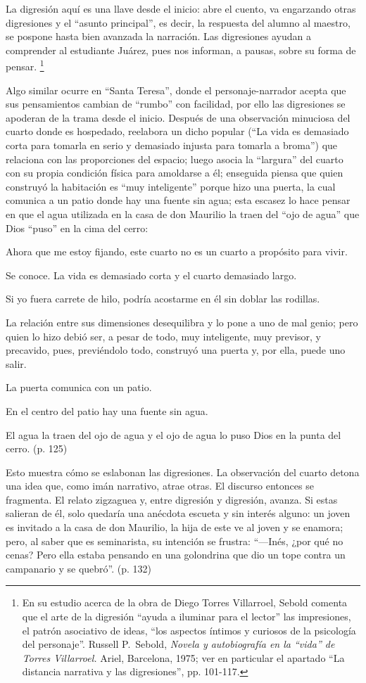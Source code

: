 \documentclass[14pt,twoside,final]{extbook} %
\let\oldfootnote\footnote
\renewcommand\footnote[1]{%
\oldfootnote{\hspace{1mm}#1}}
\begin{document}
La digresión aquí es una llave desde el inicio: abre el cuento, va engarzando otras digresiones y el ``asunto principal'', es decir, la respuesta del alumno al maestro, se pospone hasta bien avanzada la
narración. Las digresiones ayudan a comprender al estudiante Juárez, pues nos informan, a pausas, sobre su forma de pensar.\footnote{En su estudio acerca de la obra de Diego Torres Villarroel, Sebold comenta que el arte de la digresión ``ayuda a iluminar para el lector'' las impresiones, el patrón asociativo de ideas, ``los aspectos íntimos y curiosos de la psicología del personaje''. Russell P.~Sebold, \emph{Novela y autobiografía en la ``vida'' de Torres Villarroel.} Ariel, Barcelona, 1975; ver en particular el apartado ``La distancia narrativa y las digresiones'', pp. 101-117.}

Algo similar ocurre en ``Santa Teresa'', donde el personaje-narrador acepta que sus pensamientos cambian de ``rumbo'' con facilidad, por ello las digresiones se apoderan de la trama desde el inicio. Después de una observación minuciosa del cuarto donde es hospedado, reelabora un dicho popular (``La vida es demasiado corta para tomarla en serio y demasiado injusta para tomarla a broma'') que relaciona con las proporciones del espacio; luego asocia la ``largura'' del cuarto con su propia condición física para amoldarse a él; enseguida piensa que quien construyó la habitación es ``muy inteligente'' porque hizo una puerta, la cual comunica a un patio donde hay una fuente sin agua; esta escasez lo hace pensar en que el agua utilizada en la casa de don Maurilio la traen del ``ojo de agua'' que Dios ``puso'' en la cima del cerro:
\begin{quoting}
Ahora que me estoy fijando, este cuarto no es un cuarto a propósito para vivir.

Se conoce. La vida es demasiado corta y el cuarto demasiado largo.

Si yo fuera carrete de hilo, podría acostarme en él sin doblar las rodillas.

La relación entre sus dimensiones desequilibra y lo pone a uno de mal genio; pero quien lo hizo debió ser, a pesar de todo, muy inteligente, muy previsor, y precavido, pues, previéndolo todo, construyó una puerta y, por ella, puede uno salir.

La puerta comunica con un patio.

En el centro del patio hay una fuente sin agua.

El agua la traen del ojo de agua y el ojo de agua lo puso Dios en la punta del cerro. (p. 125)
\end{quoting}
Esto muestra cómo se eslabonan las digresiones. La observación del cuarto detona una idea que, como imán narrativo, atrae otras. El discurso entonces se fragmenta. El relato zigzaguea y, entre digresión y digresión, avanza. Si estas salieran de él, solo quedaría una anécdota escueta y sin interés alguno: un joven es invitado a la casa de don Maurilio, la hija de este ve al joven y se enamora; pero, al saber que es seminarista, su intención se frustra: ``---Inés, ¿por qué no cenas? Pero ella estaba pensando en una golondrina que dio un tope contra un campanario y se quebró''. (p. 132)
\end{document}
